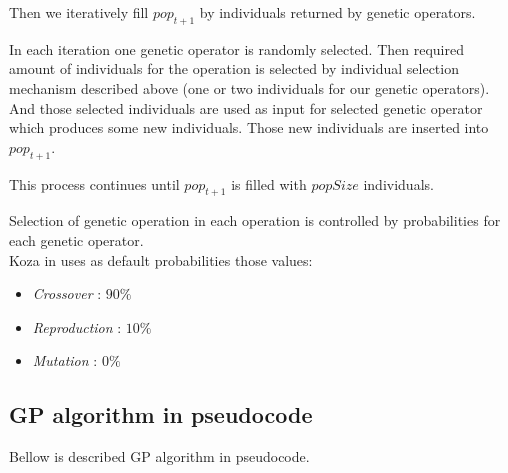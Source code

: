 \documentclass[12pt,a4paper]{report}
\begin{document}
Then we iteratively fill $pop_{t+1}$ by individuals 
returned by genetic operators.

In each iteration one genetic operator is randomly selected.
Then required amount of individuals for the operation is selected
by individual selection mechanism described above (one or two
individuals for our genetic operators).
And those selected individuals are used as input for selected
genetic operator which produces some new individuals.
Those new individuals are inserted into $pop_{t+1}$.

This process continues until $pop_{t+1}$ is filled with
$popSize$ individuals.  

Selection of genetic operation in each operation is 
controlled by probabilities for each genetic operator.\\

Koza in \cite{koza92} uses as default probabilities those values:

\begin{itemize}
	\item \textit{Crossover}    : $90\%$
	\item \textit{Reproduction} : $10\%$
	\item \textit{Mutation}     :  $0\%$
\end{itemize}



\newpage
\subsection{GP algorithm in pseudocode}

Bellow is described GP algorithm in pseudocode.
\end{document}
